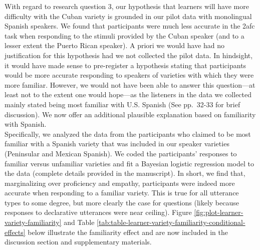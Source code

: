 \documentclass[]{article}
\begin{document}
With regard to research question 3, our hypothesis that learners will have more difficulty with the Cuban variety is grounded in our pilot data with monolingual Spanish speakers.
We found that participants were much less accurate in the 2afc task when responding to the stimuli provided by the Cuban speaker (and to a lesser extent the Puerto Rican speaker).
A priori we would have had no justification for this hypothesis had we not collected the pilot data.
In hindsight, it would have made sense to pre-register a hypothesis stating that participants would be more accurate responding to speakers of varieties with which they were more familiar.
However, we would not have been able to answer this question---at least not to the extent one would hope---as the listeners in the data we collected mainly stated being most familiar with U.S. Spanish (See pp.~32-33 for brief discussion).
We now offer an additional plausible explanation based on familiarity with Spanish.\\
Specifically, we analyzed the data from the participants who claimed to be most familiar with a Spanish variety that was included in our speaker varieties (Peninsular and Mexican Spanish).
We coded the participants' responses to familiar versus unfamiliar varieties and fit a Bayesian logistic regression model to the data (complete details provided in the manuscript).
In short, we find that, marginalizing over proficiency and empathy, participants were indeed more accurate when responding to a familiar variety.
This is true for all utterance types to some degree, but more clearly the case for questions (likely because responses to declarative utterances were near ceiling).
Figure \ref{fig:plot-learner-variety-familiarity} and Table \ref{tab:table-learner-variety-familiarity-conditional-effects} below illustrate the familiarity effect and are now included in the discussion section and supplementary materials.

\clearpage
\end{document}
